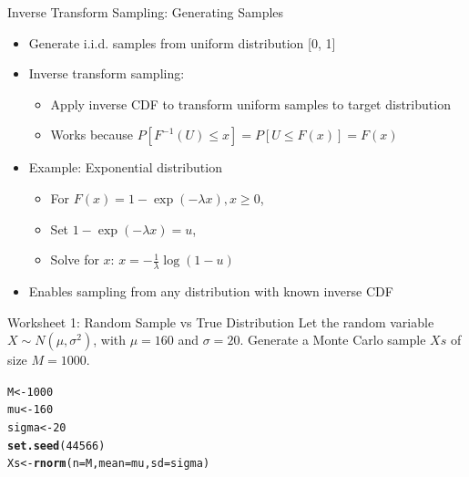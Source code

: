 \documentclass[english]{beamer}\usepackage[]{graphicx}\usepackage[]{xcolor}
\makeatletter
\newcommand{\hlnum}[1]{\textcolor[rgb]{0.686,0.059,0.569}{#1}}%
\newcommand{\hlstd}[1]{\textcolor[rgb]{0.345,0.345,0.345}{#1}}%
\newcommand{\hlkwb}[1]{\textcolor[rgb]{0.69,0.353,0.396}{#1}}%
\newcommand{\hlkwc}[1]{\textcolor[rgb]{0.333,0.667,0.333}{#1}}%
\newcommand{\hlkwd}[1]{\textcolor[rgb]{0.737,0.353,0.396}{\textbf{#1}}}%
\newenvironment{kframe}{%
 \def\at@end@of@kframe{}%
 \ifinner\ifhmode%
  \def\at@end@of@kframe{\end{minipage}}%
  \begin{minipage}{\columnwidth}%
 \fi\fi%
 \def\FrameCommand##1{\hskip\@totalleftmargin \hskip-\fboxsep
 \colorbox{shadecolor}{##1}\hskip-\fboxsep
     \hskip-\linewidth \hskip-\@totalleftmargin \hskip\columnwidth}%
 \MakeFramed {\advance\hsize-\width
   \@totalleftmargin\z@ \linewidth\hsize
   \@setminipage}}%
 {\par\unskip\endMakeFramed%
 \at@end@of@kframe}
\newenvironment{knitrout}{}{} %
\makeatother
\begin{document}
\begin{frame}{Inverse Transform Sampling: Generating Samples}

\begin{itemize}
  \item Generate i.i.d. samples from uniform distribution [0, 1]
  \item Inverse transform sampling:
    \begin{itemize}
        \item Apply inverse CDF to transform uniform samples to target distribution
        \item Works because \(P[F^{-1}(U) \leq x] = P[U \leq F(x)] = F(x)\)
    \end{itemize}
  \item Example: Exponential distribution
    \begin{itemize}
        \item For \(F(x) = 1 - \exp(-\lambda x), x \geq 0\),
        \item Set \(1 - \exp(-\lambda x) = u\),
        \item Solve for \(x\): \(x = -\frac{1}{\lambda} \log(1 - u)\)
    \end{itemize}
  \item Enables sampling from any distribution with known inverse CDF
\end{itemize}

\end{frame}







\begin{frame}[fragile]{Worksheet 1: Random Sample vs True Distribution}
Let the random variable \(X \sim N(\mu, \sigma^2)\), with \(\mu = 160\) and \(\sigma = 20\). Generate a Monte Carlo sample \(Xs\) of size \(M = 1000\).

\begin{knitrout}\small
\begin{knitrout}
\color{fgcolor}\begin{kframe}
\begin{alltt}
\hlstd{M} \hlkwb{<-} \hlnum{1000}
\hlstd{mu} \hlkwb{<-} \hlnum{160}
\hlstd{sigma} \hlkwb{<-} \hlnum{20}
\hlkwd{set.seed}\hlstd{(}\hlnum{44566}\hlstd{)}
\hlstd{Xs} \hlkwb{<-} \hlkwd{rnorm}\hlstd{(}\hlkwc{n} \hlstd{= M,} \hlkwc{mean} \hlstd{= mu,} \hlkwc{sd} \hlstd{= sigma)}
\end{alltt}
\end{kframe}
\end{knitrout}
\end{knitrout}
\end{frame}
\end{document}

